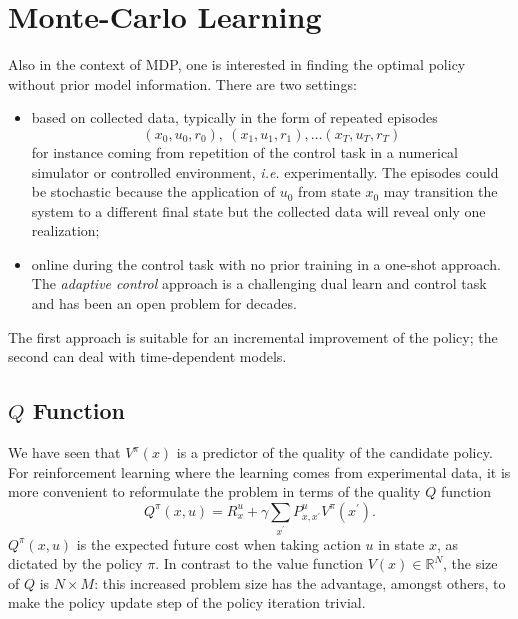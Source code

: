 \chapter{Monte-Carlo Learning}
\label{chap:mc-learning}

Also in the context of MDP, one is interested in finding the optimal policy without prior model information. There are two settings:
\begin{itemize}
\item based on collected data, typically in the form of repeated episodes
  \begin{equation*}
    (x_0,u_0,r_0),\ (x_1,u_1,r_1),\ldots (x_T,u_T,r_T)
  \end{equation*}
  for instance coming from repetition of the control task in a numerical simulator or controlled environment, \textit{i.e.} experimentally. The episodes could be stochastic because the application of $u_0$ from state $x_0$ may transition the system to a different final state but the collected data will reveal only one realization;
\item online during the control task with no prior training in a one-shot approach. The \emph{adaptive control} approach is a challenging dual learn and control task and has been an open problem for decades.
\end{itemize}
The first approach is suitable for an incremental improvement of the policy; the second can deal with time-dependent models.

\section{$Q$ Function}
\label{sec:Q-function}

We have seen that $V^\pi(x)$ is a predictor of the quality of the candidate policy. For reinforcement learning where the learning comes from experimental data, it is more convenient to reformulate the problem in terms of the quality $Q$ function
\begin{equation}
  \label{eq:q-function-definition}
  Q^\pi(x,u) = R_x^u + \gamma \sum_{x^\prime}P_{x,x^\prime}^u V^\pi (x^\prime).
\end{equation}
$Q^\pi(x,u)$ is the expected future cost when taking action $u$ in state $x$, as dictated by the policy $\pi$. In contrast to the value function $V(x)\in \mathbb{R}^N$, the size of $Q$ is $N\times M$: this increased problem size has the advantage, amongst others, to make the policy update step of the policy iteration trivial.

